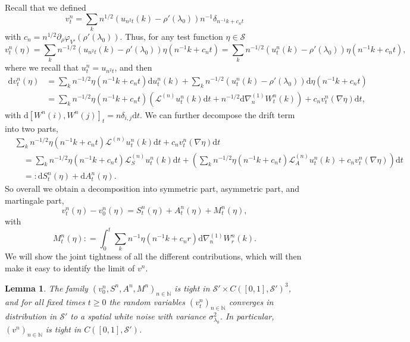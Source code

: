 \documentclass[11pt, a4paper]{article}
\newcommand{\mathd}{\mathrm{d}}
\newtheorem{lemma}[theorem]{Lemma}
\newcommand{\CS}{\mathscr{S}}
\newcommand{\CL}{\mathcal{L}}
\newcommand{\1}{\mathbf{1}}
\begin{document}
Recall that we defined
\[ v^n_t = \sum_k n^{1 / 2} (u_{n^2 t} (k) - \rho' (\lambda_0)) n^{- 1}
   \delta_{n^{- 1} k + c_n t} \]
with $c_n =  n^{1 / 2} \partial_{\rho} \varphi_{V'} (\rho' (\lambda_0))$.
Thus, for any test function $\eta \in \CS$
\[ v^n_t (\eta) = \sum_k n^{- 1 / 2} (u_{n^2 t} (k) - \rho' (\lambda_0)) \eta
   (n^{- 1} k + c_n t) = \sum_k n^{- 1 / 2} (u^n_t (k) - \rho' (\lambda_0))
   \eta (n^{- 1} k + c_n t), \]
where we recall that $u^n_t = u_{n^2 t}$, and then
\begin{align*}
 \mathd v^n_t (\eta)
 &= \sum_k n^{- 1 / 2} \eta (n^{- 1} k + c_n t) \mathd
 u^n_t (k) + \sum_k n^{- 1 / 2} (u^n_t (k) - \rho' (\lambda_0)) \mathd \eta
 (n^{- 1} k + c_n t) \\
 &= \sum_k n^{- 1 / 2} \eta (n^{- 1} k + c_n t) \left( \CL^{(n)} u^n_t (k)
 \mathd t + n^{- 1 / 2} \mathd \nabla_n^{(1)} W^n_t (k) \right) + c_n v^n_t
 (\nabla \eta) \mathd t,
\end{align*}
with $\mathd [W^n (i), W^n (j)]_t = n \delta_{i, j} \mathd t$. We can further
decompose the drift term into two parts,
\begin{align*}
 &\sum_k n^{- 1 / 2} \eta (n^{- 1} k + c_n t) \CL^{(n)} u^n_t (k) \mathd t +
 c_n v^n_t (\nabla \eta) \mathd t \\
 &\quad= \sum_k n^{- 1 / 2} \eta (n^{- 1} k + c_n t) \CL^{(n)}_S u^n_t (k) \mathd
 t
 + \left( \sum_k n^{- 1 / 2} \eta (n^{- 1} k + c_n t) \CL^{(n)}_A u^n_t (k)
 + c_n v^n_t (\nabla \eta) \right) \mathd t \\
 &\quad= : \mathd S^n_t (\eta) + \mathd A^n_t (\eta).
\end{align*}
So overall we obtain a decomposition into symmetric part, asymmetric part, and
martingale part,
\[ v^n_t (\eta) - v^n_0 (\eta) = S^n_t (\eta) + A^n_t (\eta) + M^n_t (\eta),
\]
with
\[ M^n_t (\eta) : = \int_0^t \sum_k n^{- 1} \eta (n^{- 1} k + c_n r) \mathd
   \nabla^{(1)}_n W^n_r (k) . \]
We will show the joint tightness of all the different contributions, which
will then make it easy to identify the limit of $v^n$.

\begin{lemma}
  \label{lem:tightness}The family $(v^n_0, S^n, A^n, M^n)_{n \in \mathbb{N}}$
  is tight in $\CS' \times C \left( [0, 1], \CS' \right)^3$, and for all
  fixed times $t \geqslant 0$ the random variables $(v^n_t)_{n \in
  \mathbb{N}}$ converges in distribution in $\CS'$ to a spatial white noise
  with variance $\sigma_{\lambda_0}^2$. In particular, $(v^n)_{n \in
    \mathbb{N}}$ is tight in $C \left( [0, 1], \CS' \right)$.
\end{lemma}
\end{document}
